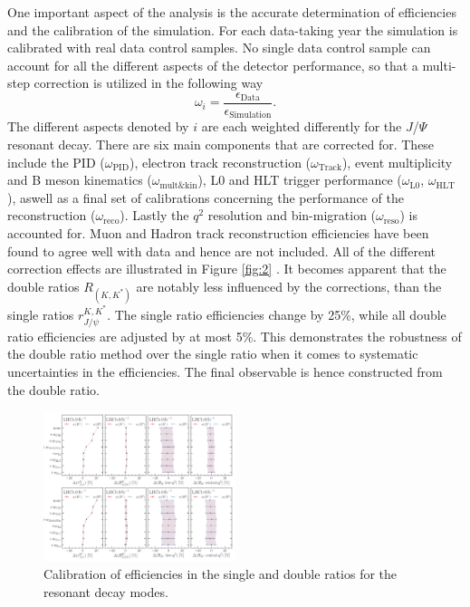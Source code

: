 \documentclass[%
 reprint,
 amsmath,amssymb,
 aps,
]{revtex4-2}
\begin{document}
One important aspect of the analysis is the accurate determination of efficiencies and the calibration of the simulation. For each data-taking year
the simulation is calibrated with real data control samples. No single data control sample can account for all the different aspects of the detector 
performance, so that a multi-step correction is utilized in the following way
\begin{equation*}
\omega_i = \frac{\epsilon_{\text{Data}}}{\epsilon_{\text{Simulation}}}.
\end{equation*}
The different aspects denoted by $i$ are each weighted differently for the $J$/$\Psi$ resonant decay. There are six main components that are corrected for. These 
include the PID ($\omega_{\text{PID}}$), electron track reconstruction ($\omega_{\text{Track}}$), event multiplicity and B meson kinematics ($\omega_{\text{mult}\&\text{kin}}$),
 L0 and HLT trigger performance ($\omega_{\text{L}0}$, $\omega_{\text{HLT}}$), aswell as a final set of calibrations concerning the performance of the reconstruction ($\omega_{\text{reco}}$).
Lastly the $q^2$ resolution and bin-migration ($\omega_{\text{reso}}$) is accounted for.
Muon and Hadron track reconstruction efficiencies have been found to agree well with data and hence are not included. 
All of the different correction effects are illustrated in Figure \ref{fig:2} . It becomes apparent that the double ratios $R_{\left(K, K^*\right)}$ are notably
less influenced by the corrections, than the single ratios  $r_{J / \psi}^{K, K^*}$. The single ratio efficiencies change by 25\%, while
all double ratio efficiencies are adjusted by at most 5\%.
This demonstrates the robustness of the double ratio method over the single ratio when it comes to systematic
uncertainties in the efficiencies. The final observable is hence constructed from the double ratio.
\begin{figure}
    \centering
    \includegraphics[width=0.5\textwidth]{eff.png}
    \caption{Calibration of efficiencies in the single and double ratios for the resonant decay modes.}
    \label{fig:3}
\end{figure}
\end{document}
